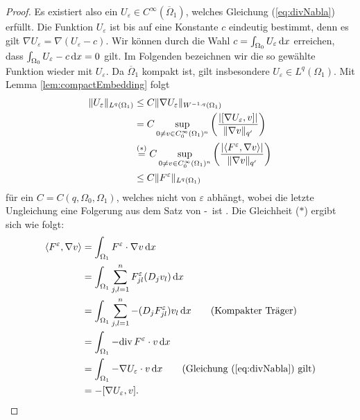 \begin{proof}
  Es existiert also ein $U_\varepsilon \in C^\infty(\overline\Omega_1)$, welches Gleichung (\ref{eq:divNabla}) erfüllt.
  Die Funktion $U_\varepsilon$ ist bis auf eine Konstante $c$ eindeutig bestimmt, denn es gilt $\nabla U_\varepsilon = \nabla( U_\varepsilon - c)$.
  Wir können durch die Wahl $c = \int_{\Omega_0} U_\varepsilon \, {\operatorname{d}\!{x}}$ erreichen, dass $\int_{\Omega_0} U_\varepsilon - c \, {\operatorname{d}\!{x}} = 0$  gilt.
  Im Folgenden bezeichnen wir die so gewählte Funktion wieder mit $U_\varepsilon$.
  Da $\overline\Omega_1$ kompakt ist, gilt insbesondere $U_\varepsilon \in L^q(\Omega_1)$.
  Mit Lemma \ref{lem:compactEmbedding} folgt
  \begingroup
  \addtolength{\jot}{1em}
  \begin{align}
    \lVert U_\varepsilon \rVert_{L^q(\Omega_1)}
    &\leq C \lVert  \nabla U_\varepsilon  \rVert_{W^{-1,q}(\Omega_1)} \nonumber\\
    &= C \sup_{0 \neq v \in C_0^\infty(\Omega_1)^n} \left(\frac{|[\nabla U_\varepsilon, v]|}{\lVert \nabla v \rVert_{q'}} \right) \nonumber\\
    &\overset{(\ast)}{=} C \sup_{0 \neq v \in C_0^\infty(\Omega_1)^n} \left( \frac{|\langle F^\varepsilon, \nabla v \rangle|}{\lVert \nabla v \rVert_{q'}}\right) \nonumber\\
    &\leq C \lVert F^\varepsilon \rVert_{L^q(\Omega_1)} 
    \label{eq:inequalityUEpsilon}
  \end{align}
  \endgroup
  für ein $C = C(q,\Omega_0,\Omega_1)$, welches nicht von $\varepsilon$ abhängt, wobei die letzte Ungleichung eine Folgerung aus dem Satz von \hahn\hyp\banach\ ist \cite[S.98, Korollar III.1.7]{werner2011fa}.
  Die Gleichheit ($\ast$) ergibt sich wie folgt:
  \begin{align*}
    \langle F^\varepsilon, \nabla v \rangle
    &= \int_{\Omega_1} F^\varepsilon \cdot \nabla v \d x \\
    &= \int_{\Omega_1} \sum_{j,l=1}^n F_{jl}^\varepsilon (D_j v_l) \d x \\
    &= \int_{\Omega_1} \sum_{j,l=1}^n -(D_jF_{jl}^\varepsilon) v_l \d x \tag{Kompakter Träger}\\
    &= \int_{\Omega_1} -\div F^\varepsilon \cdot v \d x \\
    &= \int_{\Omega_1} -\nabla U_\varepsilon \cdot v \d x \tag{Gleichung (\ref{eq:divNabla}) gilt}\\
    &= -[\nabla U_\varepsilon, v].
  \end{align*}


\end{proof}

